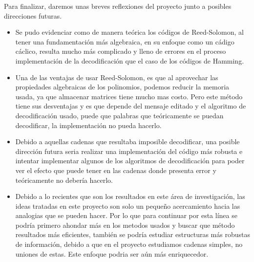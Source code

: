 Para finalizar, daremos unas breves reflexiones del proyecto junto a posibles direcciones futuras.
\begin{itemize}
    \item Se pudo evidenciar como de manera teórica los códigos de Reed-Solomon, al tener una fundamentación más algebraica, en su enfoque como un cádigo cáclico, resulta mucho más complicado y lleno de errores en el proceso implementación de la decodificación que el caso de los códigos de Hamming.
    \item Una de las ventajas de usar Reed-Solomon, es que al aprovechar las propiedades algebraicas de los polinomios, podemos reducir la memoria usada, ya que almacenar matrices tiene mucho mas costo. Pero este método tiene sus desventajas y es que depende del mensaje editado y el algoritmo de decodificación usado, puede que palabras que teóricamente se puedan decodificar, la implementación no pueda hacerlo.
    \item Debido a aquellas cadenas que resultaba imposible decodificar, una posible dirección futura seria realizar una implementación del código más robusta  e intentar implementar algunos de los algoritmos de decodificación para poder ver el efecto que puede tener en las cadenas donde presenta error y teóricamente no debería hacerlo.
    \item Debido a lo recientes que son los resultados en este área de investigación, las ideas tratadas en este proyecto son solo un pequeño acercamiento hacia las analogias que se pueden hacer. Por lo que para continuar por esta línea se podría primero ahondar más en los metodos usados y buscar que método resultados más eficientes, también se podría estudiar estructuras más robustas de información, debido a que en el proyecto estudiamos cadenas simples, no uniones de estas. Este enfoque podria ser aún más enriquecedor.
\end{itemize}